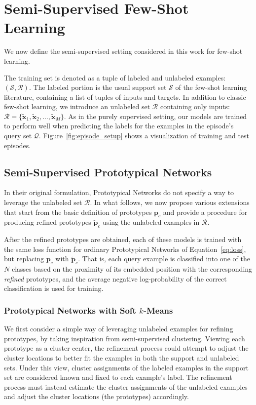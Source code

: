 \section{Semi-Supervised Few-Shot Learning}

We now define the semi-supervised setting considered in this work for few-shot learning.

The training set is denoted as a tuple of labeled and unlabeled examples: $(\mathcal{S},
\mathcal{R})$. The labeled portion is the usual support set $\mathcal{S}$ of the few-shot learning
literature, containing a list of tuples of inputs and targets.  In addition to classic few-shot
learning, we introduce an unlabeled set $\mathcal{R}$ containing only inputs:
$\mathcal{R}=\{\tilde{\bm{x}}_1, \tilde{\bm{x}}_2, \dots, \tilde{\bm{x}}_M\}$.  As in the purely
supervised setting, our models are trained to perform well when predicting the labels for the
examples in the episode's query set $\mathcal{Q}$.  Figure~\ref{fig:episode_setup} shows a
visualization of training and test episodes.



\subsection{Semi-Supervised Prototypical Networks}

In their original formulation, Prototypical Networks do not specify a way to leverage the unlabeled
set $\mathcal{R}$. In  what follows, we now propose various extensions that start from the basic
definition of prototypes $\bm{p}_c$ and provide a procedure for producing refined prototypes
$\tilde{\bm{p}}_c$ using the unlabeled examples in $\mathcal{R}$.



After the refined prototypes are obtained, each of these models is trained with the same loss
function for ordinary Prototypical Networks of Equation~\ref{eq:loss}, but replacing $\bm{p}_c$
with $\tilde{\bm{p}}_c$. That is, each query example is classified into one of the $N$ classes based
on the proximity of its embedded position with the corresponding {\it refined} prototypes, and the
average negative log-probability of the correct classification is used for training.

\subsubsection{Prototypical Networks with Soft $k$-Means}
We first consider a simple way of leveraging unlabeled examples for refining prototypes, by taking
inspiration from semi-supervised clustering. Viewing each prototype as a cluster center, the
refinement process could attempt to adjust the cluster locations to better fit the examples in both
the support and unlabeled sets. Under this view, cluster assignments of the labeled examples in the
support set are considered known and fixed to each example's label.  The refinement process must
instead estimate the cluster assignments of the unlabeled examples and adjust the cluster locations
(the prototypes) accordingly.

